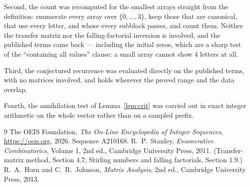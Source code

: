 \documentclass[11pt,a4paper]{article}
\theoremstyle{plain}
\theoremstyle{definition}
\begin{document}
Second, the count was recomputed for the smallest arrays straight from the definition:
enumerate every array over $\{0,\dots,3\}$, keep those that are canonical, that use every
letter, and whose every subblock passes, and count them. Neither the transfer matrix nor the
falling-factorial inversion is involved, and the published terms came back --- including the
initial zeros, which are a sharp test of the ``containing all values'' clause: a small array
cannot show $4$ letters at all.

Third, the conjectured recurrence was evaluated directly on the published terms, with no
matrices involved, and holds wherever the proved range and the data overlap.

Fourth, the annihilation test of Lemma~\ref{lem:crit} was carried out in exact integer
arithmetic on the whole vector rather than on a sampled prefix.

\begin{thebibliography}{9}
 The OEIS Foundation, \emph{The On-Line Encyclopedia of Integer
Sequences}, \url{https://oeis.org}, 2026. Sequence A210168.
 R.~P.~Stanley, \emph{Enumerative Combinatorics}, Volume 1, 2nd ed.,
Cambridge University Press, 2011. (Transfer-matrix method, Section 4.7; Stirling numbers and
falling factorials, Section 1.9.)
 R.~A.~Horn and C.~R.~Johnson, \emph{Matrix Analysis}, 2nd ed., Cambridge
University Press, 2013.
\end{thebibliography}
\end{document}
